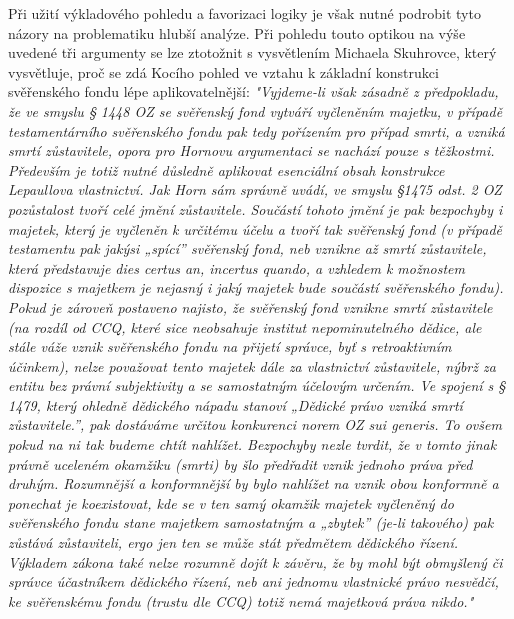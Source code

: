\documentclass{article}
\begin{document}
 Při užití výkladového pohledu a favorizaci logiky je však nutné podrobit tyto názory na problematiku hlubší analýze. Při pohledu touto optikou na výše uvedené tři argumenty se lze ztotožnit s vysvětlením Michaela Skuhrovce, který vysvětluje, proč se zdá Kocího pohled ve vztahu k základní konstrukci svěřenského fondu lépe aplikovatelnější: \textit{"Vyjdeme-li však zásadně z předpokladu, že ve smyslu § 1448 OZ se svěřenský fond vytváří vyčleněním majetku, v případě testamentárního svěřenského fondu pak tedy pořízením pro případ smrti, a vzniká smrtí zůstavitele, opora pro Hornovu argumentaci se nachází pouze s těžkostmi. Především je totiž nutné důsledně aplikovat esenciální obsah konstrukce Lepaullova vlastnictví. Jak Horn sám správně uvádí, ve smyslu §1475 odst. 2 OZ pozůstalost tvoří celé jmění zůstavitele. Součástí tohoto jmění je pak bezpochyby i majetek, který je vyčleněn k určitému účelu a tvoří tak svěřenský fond (v případě testamentu pak jakýsi „spící” svěřenský fond, neb vznikne až smrtí zůstavitele, která představuje dies certus an, incertus quando, a vzhledem k možnostem dispozice s majetkem je nejasný i jaký majetek bude součástí svěřenského fondu). Pokud je zároveň postaveno najisto, že svěřenský fond vznikne smrtí zůstavitele (na rozdíl od CCQ, které sice neobsahuje institut nepominutelného dědice, ale stále váže vznik svěřenského fondu na přijetí správce, byť s retroaktivním účinkem), nelze považovat tento majetek dále za vlastnictví zůstavitele, nýbrž za entitu bez právní subjektivity a se samostatným účelovým určením. Ve spojení s § 1479, který ohledně dědického nápadu stanoví „Dědické právo vzniká smrtí zůstavitele.”, pak dostáváme určitou konkurenci norem OZ sui generis. To ovšem pokud na ni tak budeme chtít nahlížet. Bezpochyby nezle tvrdit, že v tomto jinak právně uceleném okamžiku (smrti) by šlo předřadit vznik jednoho práva před druhým. Rozumnější a konformnější by bylo nahlížet na vznik obou konformně a ponechat je koexistovat, kde se v ten samý okamžik majetek vyčleněný do svěřenského fondu stane majetkem samostatným a „zbytek” (je-li takového) pak zůstává zůstaviteli, ergo jen ten se může stát předmětem dědického řízení. Výkladem zákona také nelze rozumně dojít k závěru, že by mohl být obmyšlený či správce účastníkem dědického řízení, neb ani jednomu vlastnické právo nesvědčí, ke svěřenskému fondu (trustu dle CCQ) totiž nemá majetková práva nikdo."}\\
 
\end{document}

